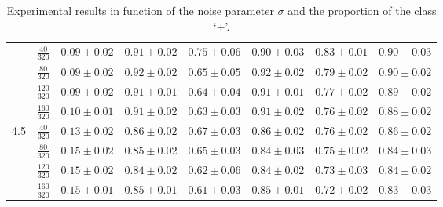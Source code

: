 \documentclass[twocolumn,english]{article}
\begin{document}
\begin{table*}[ht]
\begin{center}
\begin{tabular}{|cc|cc|ccc|c|}
   	 	& $\frac{40}{320}$ & $0.09 \pm 0.02$        & $0.91 \pm 0.02$       
           & $\mathbf{0.75} \pm 0.06$		& $0.90 \pm 0.03$        & $0.83 \pm 0.01$	& $\mathbf{0.90} \pm 0.03$        \\

   	 	& $\frac{80}{320}$ & $0.09 \pm 0.02$        & $0.92 \pm 0.02$        
           & $\mathbf{0.65} \pm 0.05$		& $0.92 \pm 0.02$        & $0.79 \pm 0.02$	& $\mathbf{0.90} \pm 0.02$        \\

   	 	& $\frac{120}{320}$ & $0.09 \pm 0.02$        & $0.91 \pm 0.01$      
           & $\mathbf{0.64} \pm 0.04$		& $0.91 \pm 0.01$        & $0.77 \pm 0.02$	& $\mathbf{0.89} \pm 0.02$        \\

   	 	& $\frac{160}{320}$  & $0.10 \pm 0.01$        & $0.91 \pm 0.02$      
           & $\mathbf{0.63} \pm 0.03$		& $0.91 \pm 0.02$        & $0.76 \pm 0.02$	& $\mathbf{0.88} \pm 0.02$        \\

           \hline
   \multirow{4}{3mm}{4.5}

   	 	& $\frac{40}{320}$ & $0.13 \pm 0.02$        & $0.86 \pm 0.02$       
           & $\mathbf{0.67} \pm 0.03$		& $0.86 \pm 0.02$        & $0.76 \pm 0.02$	& $\mathbf{0.86} \pm 0.02$        \\

   	 	& $\frac{80}{320}$  & $0.15 \pm 0.02$        & $0.85 \pm 0.02$        
           & $\mathbf{0.65} \pm 0.03$		& $0.84 \pm 0.03$        & $0.75 \pm 0.02$	& $\mathbf{0.84} \pm 0.03$        \\

   	 	& $\frac{120}{320}$ & $0.15 \pm 0.02$        & $0.84 \pm 0.02$      
           & $\mathbf{0.62} \pm 0.06$		& $0.84 \pm 0.02$        & $0.73 \pm 0.03$	& $\mathbf{0.84} \pm 0.02$        \\

   	 	& $\frac{160}{320}$ & $0.15 \pm 0.01$        & $0.85 \pm 0.01$      
           & $\mathbf{0.61} \pm 0.03$		& $0.85 \pm 0.01$        & $0.72 \pm 0.02$	& $\mathbf{0.83} \pm 0.03$        \\

   \hline
   \end{tabular}
\vspace{.3cm}
\caption{Experimental results in function of the noise parameter $\sigma$ and the proportion of the class `$+$'.} 
\label{tab-results}
 \end{center}
\end{table*}
\end{document}
